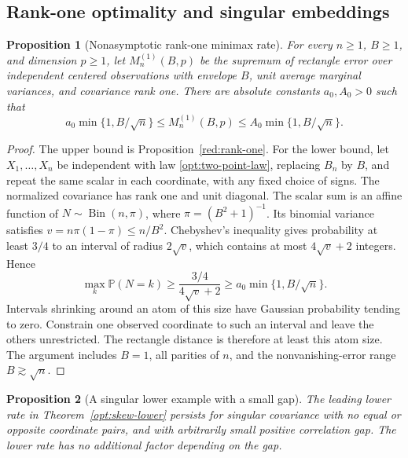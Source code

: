 \documentclass[11pt,a4paper]{article}
\newtheorem{proposition}{Proposition}
\theoremstyle{remark}
\newcommand{\Pp}{\mathbb P}
\begin{document}
\subsection{Rank-one optimality and singular embeddings}
\label{opt:rank-and-singularity}

\begin{proposition}[Nonasymptotic rank-one minimax rate]
\label{opt:rank-one-minimax}
For every \(n\ge1\), \(B\ge1\), and dimension \(p\ge1\), let
\(M_n^{(1)}(B,p)\) be the supremum of rectangle error over independent
centered observations with envelope \(B\), unit average marginal
variances, and covariance rank one. There are absolute constants
\(a_0,A_0>0\) such that
\begin{equation}
 a_0\min\{1,B/\sqrt n\}
 \le M_n^{(1)}(B,p)
 \le A_0\min\{1,B/\sqrt n\}.
 \label{opt:rank-one-minimax-rate}
\end{equation}
\end{proposition}

\begin{proof}
The upper bound is Proposition~\ref{red:rank-one}. For the lower bound,
let \(X_1,\ldots,X_n\) be independent with law
\eqref{opt:two-point-law}, replacing \(B_n\) by \(B\), and repeat the
same scalar in each coordinate, with any fixed choice of signs.
The normalized covariance has rank one and unit diagonal. The scalar
sum is an affine function of \(N\sim\operatorname{Bin}(n,\pi)\), where
\(\pi=(B^2+1)^{-1}\). Its binomial variance satisfies
\(v=n\pi(1-\pi)\le n/B^2\). Chebyshev's inequality gives probability
at least \(3/4\) to an interval of radius \(2\sqrt v\), which contains
at most \(4\sqrt v+2\) integers. Hence
\[
 \max_k\Pp(N=k)\ge\frac{3/4}{4\sqrt v+2}
 \ge a_0\min\{1,B/\sqrt n\}.
\]
Intervals shrinking around an atom of this size have Gaussian
probability tending to zero. Constrain one observed coordinate to such
an interval and leave the others unrestricted. The rectangle distance
is therefore at least this atom size. The argument includes \(B=1\),
all parities of \(n\), and the nonvanishing-error range \(B\gtrsim\sqrt n\).
\end{proof}

\begin{proposition}[A singular lower example with a small gap]
\label{opt:singular-embedding}
The leading lower rate in Theorem~\ref{opt:skew-lower} persists for
singular covariance with no equal or opposite coordinate pairs, and
with arbitrarily small positive correlation gap. The lower rate has no
additional factor depending on the gap.
\end{proposition}
\end{document}
